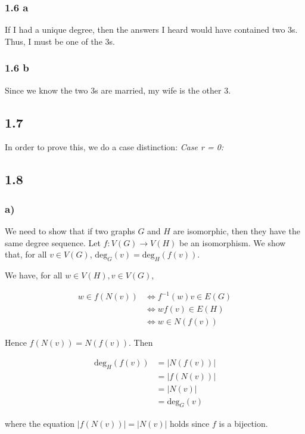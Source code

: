 \documentclass[a4paper]{article}
\begin{document}
\subsubsection*{1.6 a}
If I had a unique degree, then the answers I heard would have contained two 3s. Thus, I must be one of the 3s.
\subsubsection*{1.6 b}
Since we know the two 3s are married, my wife is the other 3.

\subsection*{1.7}
In order to prove this, we do a case distinction:\newline
\emph{Case r = 0:}

\subsection*{1.8}
\subsubsection*{a)} 
We need to show that if two graphs $G$ and $H$ are isomorphic, then they have the same degree sequence.
Let $f : V(G) \to V(H)$ be an isomorphism. We show that, for all $v \in V(G)$, $\mathrm{deg}_G(v) = \mathrm{deg}_H(f(v))$.

We have, for all $w \in V(H), v \in V(G)$,

\begin{align*}
w \in f(N(v)) &\Leftrightarrow f^{-1}(w)v \in E(G)\\
              &\Leftrightarrow wf(v) \in E(H)\\
              &\Leftrightarrow w \in N(f(v))
\end{align*}

Hence $f(N(v)) = N(f(v))$. Then

\begin{align*}
\mathrm{deg}_H(f(v)) &= |N(f(v))|\\
                     &= |f(N(v))|\\
                     &= |N(v)|\\
                     &= \mathrm{deg}_G(v)
\end{align*}

where the equation $|f(N(v))| = |N(v)|$ holds since $f$ is a bijection.
\end{document}

